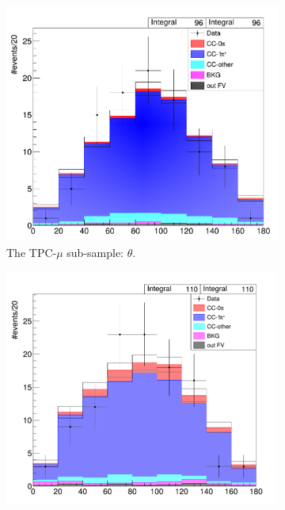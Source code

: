 \begin{figure}[h]
\begin{subfigure}{\dbfigwid\textwidth}
                    \label{subfig:datamc-sfgmu}
               \end{subfigure}
               \\
               \begin{subfigure}{\dbfigwid\textwidth}
                    \includegraphics[width=\textwidth]{figures/sel/datamc-comp-tpi-tpcmu.png}
                    \caption{The TPC-$\mu$ sub-sample: $\theta$.}
                    \label{subfig:datamc-theta-tpcmu}
               \end{subfigure}
               \begin{subfigure}{\dbfigwid\textwidth}
                    \includegraphics[width=\textwidth]{figures/sel/datamc-comp-tpi-sfgmu.png}

\end{subfigure}
\end{figure}
